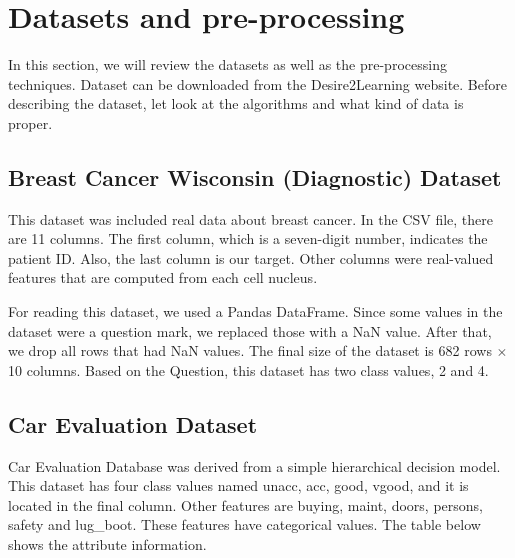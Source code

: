 \vspace{2cm}
\section{ Datasets and pre-processing}
\vspace{2cm}
In this section, we will review the datasets as well as the pre-processing techniques. Dataset can be downloaded from the Desire2Learning website. 
Before describing the dataset, let look at the algorithms and what kind of data is proper.






\subsection{Breast Cancer Wisconsin (Diagnostic) Dataset}

This dataset was included real data about breast cancer. In the CSV file, there are 11 columns. The first column, which is a seven-digit number, indicates the patient ID. Also, the last column is our target. Other columns were real-valued features that are computed from each cell nucleus. 

For reading this dataset, we used a Pandas DataFrame. Since some values in the dataset were a question mark, we replaced those with a NaN value. After that, we drop all rows that had NaN values. The final size of the dataset is 682 rows $\times$ 10 columns. Based on the Question, this dataset has two class values, 2 and 4.









\subsection{Car Evaluation Dataset}

Car Evaluation Database was derived from a simple hierarchical decision model. This dataset has four class values named unacc, acc, good, vgood, and it is located in the final column. Other features are buying, maint, doors, persons, safety and lug\_boot. These features have categorical values. The table below shows the attribute information.  


